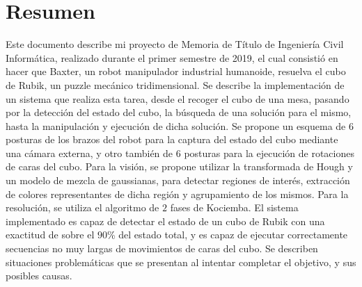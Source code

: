 

\chapter*{Resumen}
\label{cha:abstract}

Este documento describe mi proyecto de Memoria de Título de Ingeniería Civil Informática, realizado durante el primer semestre de 2019, el cual consistió en hacer que Baxter, un robot manipulador industrial humanoide, resuelva el cubo de Rubik, un puzzle mecánico tridimensional. Se describe la implementación de un sistema que realiza esta tarea, desde el recoger el cubo de una mesa, pasando por la detección del estado del cubo, la búsqueda de una solución para el mismo, hasta la manipulación y ejecución de dicha solución. Se propone un esquema de 6 posturas de los brazos del robot para la captura del estado del cubo mediante una cámara externa, y otro también de 6 posturas para la ejecución de rotaciones de caras del cubo. Para la visión, se propone utilizar la transformada de Hough y un modelo de mezcla de gaussianas, para detectar regiones de interés, extracción de colores representantes de dicha región y agrupamiento de los mismos. Para la resolución, se utiliza el algoritmo de $2$ fases de Kociemba. El sistema implementado es capaz de detectar el estado de un cubo de Rubik con una exactitud de sobre el $90$\% del estado total, y es capaz de ejecutar correctamente secuencias no muy largas de movimientos de caras del cubo. Se describen situaciones problemáticas que se presentan al intentar completar el objetivo, y sus posibles causas.

